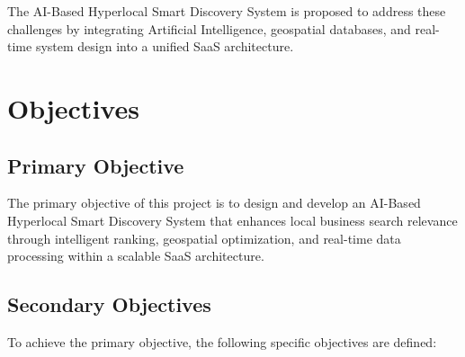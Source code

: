 \documentclass[12pt,a4paper]{report}
\begin{document}
The AI-Based Hyperlocal Smart Discovery System is proposed to address these challenges by integrating Artificial Intelligence, geospatial databases, and real-time system design into a unified SaaS architecture.


\chapter{Objectives}

\section{Primary Objective}

The primary objective of this project is to design and develop an AI-Based Hyperlocal Smart Discovery System that enhances local business search relevance through intelligent ranking, geospatial optimization, and real-time data processing within a scalable SaaS architecture.

\section{Secondary Objectives}

To achieve the primary objective, the following specific objectives are defined:
\end{document}
